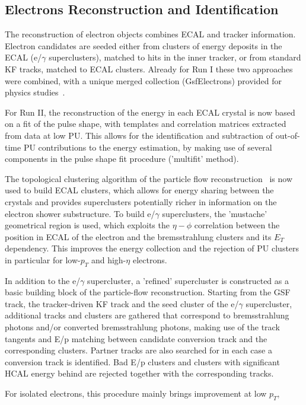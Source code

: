 \subsection{Electrons Reconstruction and Identification}
The reconstruction of electron objects combines ECAL and tracker information.
Electron candidates are seeded either from clusters of energy
deposits in the ECAL (e/$\gamma$ superclusters), matched to hits in the inner
tracker, or from standard KF tracks, matched to ECAL clusters. Already for
Run I these two approaches were combined, with a unique merged collection
(GsfElectrons) provided for physics studies~\cite{cms:38ea}.
\par
For Run II, the reconstruction of the energy in each ECAL crystal is now
based on a fit of the pulse shape, with templates and correlation matrices
extracted from data at low PU. This allows for the identification and
subtraction of out-of-time PU contributions to the energy estimation, by making
use of several components in the pulse shape fit procedure ('multifit'
method).
\par
The topological clustering algorithm of the particle flow
reconstruction~\cite{CMS-PAS-PFT-09-001,CMS-PAS-PFT-10-001} is now used to build ECAL clusters, which
allows for energy sharing between the crystals and provides superclusters
potentially richer in information on the electron shower substructure. To build
e/$\gamma$ superclusters, the 'mustache' geometrical region is used, which exploits
the $\eta-\phi$ correlation between the position in ECAL of the electron
and the bremsstrahlung clusters and its $E_T$ dependency. This improves the
energy collection and the rejection of PU clusters in particular for low-$p_T$
and high-$\eta$ electrons.
\par
In addition to the e/$\gamma$ supercluster, a 'refined' supercluster is
constructed as a basic building block of the particle-flow reconstruction.
Starting from the GSF track, the tracker-driven KF track and the seed cluster of
the e/$\gamma$ supercluster, additional tracks and clusters are gathered that
correspond to bremsstrahlung photons and/or converted bremsstrahlung photons,
making use of the track tangents and E/p matching between candidate conversion
track and the corresponding clusters. Partner tracks are also searched for in
each case a conversion track is identified. Bad E/p clusters and clusters with
significant HCAL energy behind are rejected together with the corresponding
tracks.
\par
For isolated electrons, this procedure mainly brings improvement at low $p_T$,
